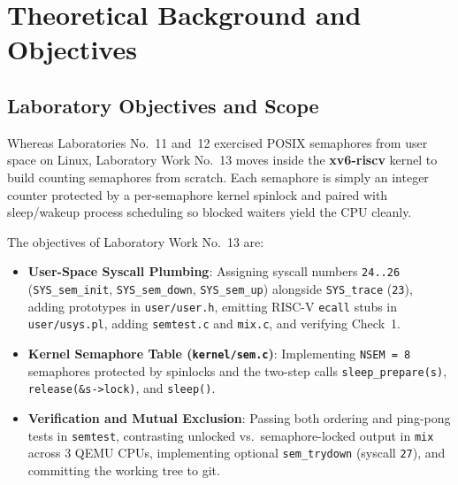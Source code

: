 \documentclass[12pt,a4paper]{article}
\begin{document}
\section{Theoretical Background and Objectives}

\subsection{Laboratory Objectives and Scope}
Whereas Laboratories No.~11 and~12 exercised POSIX semaphores from user space on Linux, Laboratory Work No.~13 moves inside the \textbf{xv6-riscv} kernel to build counting semaphores from scratch. Each semaphore is simply an integer counter protected by a per-semaphore kernel spinlock and paired with sleep/wakeup process scheduling so blocked waiters yield the CPU cleanly.

The objectives of Laboratory Work No.~13 are:
\begin{itemize}
    \item \textbf{User-Space Syscall Plumbing}: Assigning syscall numbers \texttt{24..26} (\texttt{SYS\_\allowbreak sem\_\allowbreak init}, \texttt{SYS\_\allowbreak sem\_\allowbreak down}, \texttt{SYS\_\allowbreak sem\_\allowbreak up}) alongside \texttt{SYS\_\allowbreak trace} (\texttt{23}), adding prototypes in \texttt{user/\allowbreak user.h}, emitting RISC-V \texttt{ecall} stubs in \texttt{user/\allowbreak usys.pl}, adding \texttt{semtest.c} and \texttt{mix.c}, and verifying Check~1.
    \item \textbf{Kernel Semaphore Table (\texttt{kernel/\allowbreak sem.c})}: Implementing \texttt{NSEM = 8} semaphores protected by spinlocks and the two-step calls \texttt{sleep\_\allowbreak prepare(s)}, \texttt{release(\allowbreak\&s->\allowbreak lock)}, and \texttt{sleep()}.
    \item \textbf{Verification and Mutual Exclusion}: Passing both ordering and ping-pong tests in \texttt{semtest}, contrasting unlocked vs.\ semaphore-locked output in \texttt{mix} across 3 QEMU CPUs, implementing optional \texttt{sem\_\allowbreak trydown} (syscall \texttt{27}), and committing the working tree to git.
\end{itemize}
\end{document}
